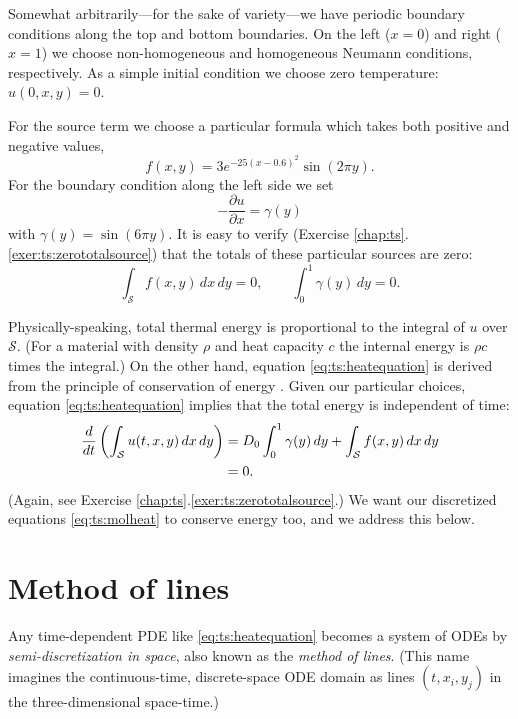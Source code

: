 Somewhat arbitrarily---for the sake of variety---we have periodic boundary conditions along the top and bottom boundaries.  On the left ($x=0$) and right ($x=1$) we choose non-homogeneous and homogeneous Neumann conditions, respectively.  As a simple initial condition we choose zero temperature: $u(0,x,y)=0$.

For the source term we choose a particular formula which takes both positive and negative values,
    $$f(x,y) = 3 e^{-25(x-0.6)^2} \sin(2 \pi y).$$
For the boundary condition along the left side we set
\begin{equation}
-\frac{\partial u}{\partial x} = \gamma(y) \label{eq:ts:leftneumannbc}
\end{equation}
with $\gamma(y) = \sin(6\pi y)$.  It is easy to verify (Exercise \ref{chap:ts}.\ref{exer:ts:zerototalsource}) that the totals of these particular sources are zero:
\begin{equation}
\int_{\mathcal{S}} f(x,y)\,dx\,dy = 0, \qquad \int_0^1 \gamma(y)\,dy = 0. \label{eq:ts:zerototalsource}
\end{equation}

Physically-speaking, total thermal energy is proportional to the integral of $u$ over $\mathcal{S}$.  (For a material with density $\rho$ and heat capacity $c$ the internal energy is $\rho c$ times the integral.)  On the other hand, equation \eqref{eq:ts:heatequation} is derived from the principle of conservation of energy \citep{Ockendonetal2003}.  Given our particular choices, equation \eqref{eq:ts:heatequation} implies that the total energy is independent of time:
\begin{align}
\frac{d}{dt} \left(\int_{\mathcal{S}} u(t,x,y)\,dx\,dy\right) &= D_0 \int_0^1 \gamma(y)\,dy + \int_{\mathcal{S}} f(x,y)\,dx\,dy \label{eq:ts:conservedscalar} \\
   &= 0. \notag
\end{align}
(Again, see Exercise \ref{chap:ts}.\ref{exer:ts:zerototalsource}.)  We want our discretized equations \eqref{eq:ts:molheat} to conserve energy too, and we address this below.


\section{Method of lines}  Any time-dependent PDE like \eqref{eq:ts:heatequation} becomes a system of ODEs by \emph{semi-discretization in space}, also known as the \emph{method of lines}.  (This name imagines the continuous-time, discrete-space ODE domain as lines $(t,x_i,y_j)$ in the three-dimensional space-time.)


